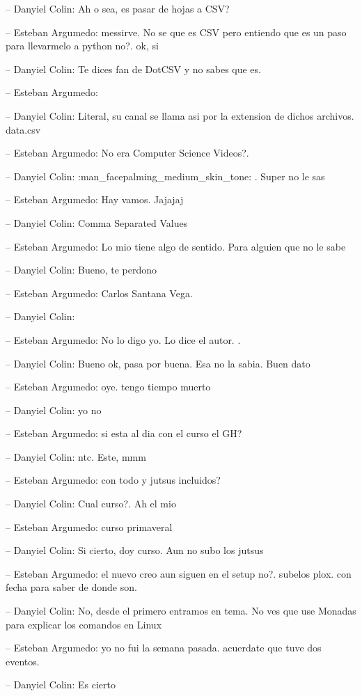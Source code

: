-- Danyiel Colin: Ah o sea, es pasar de hojas a CSV?

-- Esteban Argumedo: messirve. No se que es CSV pero entiendo que es un
paso para llevarmelo a python no?. ok, si

-- Danyiel Colin: Te dices fan de DotCSV y no sabes que es.

-- Esteban Argumedo:

-- Danyiel Colin: Literal, su canal se llama asi por la extension de
dichos archivos. data.csv

-- Esteban Argumedo: No era Computer Science Videos?.

-- Danyiel Colin: :man\_facepalming\_medium\_skin\_tone: . Super no le
sas

-- Esteban Argumedo: Hay vamos. Jajajaj

-- Danyiel Colin: Comma Separated Values

-- Esteban Argumedo: Lo mio tiene algo de sentido. Para alguien que no
le sabe

-- Danyiel Colin: Bueno, te perdono

-- Esteban Argumedo: Carlos Santana Vega.

-- Danyiel Colin:

-- Esteban Argumedo: No lo digo yo. Lo dice el autor. .

-- Danyiel Colin: Bueno ok, pasa por buena. Esa no la sabia. Buen dato

-- Esteban Argumedo: oye. tengo tiempo muerto

-- Danyiel Colin: yo no

-- Esteban Argumedo: si esta al dia con el curso el GH?

-- Danyiel Colin: ntc. Este, mmm

-- Esteban Argumedo: con todo y jutsus incluidos?

-- Danyiel Colin: Cual curso?. Ah el mio

-- Esteban Argumedo: curso primaveral

-- Danyiel Colin: Si cierto, doy curso. Aun no subo los jutsus

-- Esteban Argumedo: el nuevo creo aun siguen en el setup no?. subelos
plox. con fecha para saber de donde son.

-- Danyiel Colin: No, desde el primero entramos en tema. No ves que use
Monadas para explicar los comandos en Linux

-- Esteban Argumedo: yo no fui la semana pasada. acuerdate que tuve dos
eventos.

-- Danyiel Colin: Es cierto

